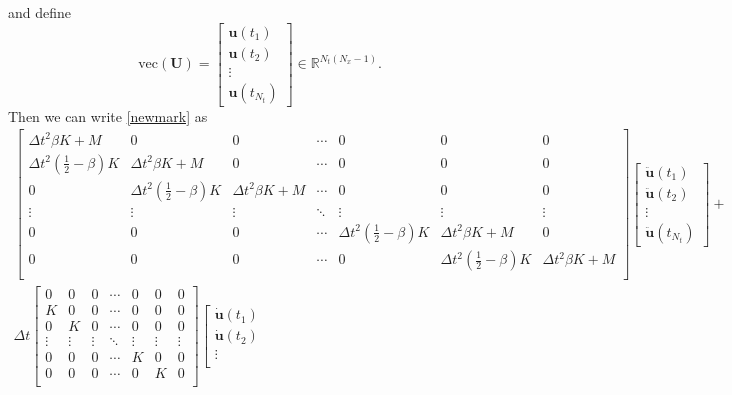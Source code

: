 \documentclass{ws-m3as}
\begin{document}
and define
$$
\mathrm{vec}(\mathbf{U}) = \left[
\begin{array}{c}
\mathbf{u}(t_1)\\
\mathbf{u}(t_2) \\
\vdots \\
\mathbf{u}(t_{N_t}) 
\end{array}
\right] \in \mathbb{R}^{N_t(N_x-1)}.
$$
Then we can write \eqref{newmark}  as
\begin{align*}
\left[
\begin{array}{ccccccc}
\Delta t^2 \beta K + M & 0 & 0  &\cdots & 0 & 0 & 0 \\
\Delta t^2 \left( \frac{1}{2} - \beta \right) K & \Delta t^2 \beta K + M & 0 & \cdots & 0 & 0 & 0 \\
0 & \Delta t^2 \left( \frac{1}{2} - \beta \right) K & \Delta t^2 \beta K + M & \cdots & 0 & 0 & 0 \\
\vdots & \vdots & \vdots & \ddots & \vdots & \vdots & \vdots \\
0 & 0 & 0 & \cdots & \Delta t^2 \left( \frac{1}{2} - \beta \right) K & \Delta t^2 \beta K + M & 0 \\
0 & 0 & 0 & \cdots & 0 & \Delta t^2 \left( \frac{1}{2} - \beta \right) K  & \Delta t^2 \beta K + M \\
\end{array}
\right]\left[
\begin{array}{c}
\ddot{\mathbf{u}}(t_1)\\
\ddot{\mathbf{u}}(t_2) \\
\vdots \\
\ddot{\mathbf{u}}(t_{N_t}) 
\end{array}
\right] +  \\
\Delta t \left[
\begin{array}{ccccccc}
0 & 0 & 0  &\cdots & 0 & 0 & 0 \\
 K & 0 & 0 & \cdots & 0 & 0 & 0 \\
0 & K & 0 & \cdots & 0 & 0 & 0 \\
\vdots & \vdots & \vdots & \ddots & \vdots & \vdots & \vdots \\
0 & 0 & 0 & \cdots & K & 0 & 0 \\
0 & 0 & 0 & \cdots & 0 & K  & 0 \\
\end{array}
\right]\left[
\begin{array}{c}
\dot{\mathbf{u}}(t_1)\\
\dot{\mathbf{u}}(t_2) \\
\vdots \\

\end{array}
\end{align*}
\end{document}
